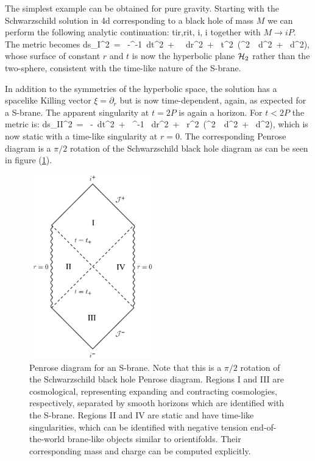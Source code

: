 The simplest example can be obtained for pure gravity. Starting with  the Schwarzschild solution in 4d corresponding to a black hole of mass $M$ we can perform the following analytic continuation:
 \be
 t\rightarrow ir,\qquad  r\rightarrow it, \qquad
 \theta\rightarrow i\theta, \qquad \phi\rightarrow i\phi
 \ee
  together 
with $M\rightarrow iP$. The metric becomes
\be
d\hat s_I^2\ = \ -^{-1}\ dt^2\ + 
\  \ dr^2\ + \ t^2\ \left(\sinh^2\theta\ \ 
d\phi^2\ + \ d\theta^2\right), 
\ee
whose surface of constant $r$ and $t$ is now the 
hyperbolic plane ${\cal H}_2$ rather than the two-sphere, consistent with the time-like nature of the S-brane. 

In addition to the symmetries of the hyperbolic space, the solution has
a spacelike Killing vector $\xi=\partial_r$ but is now time-dependent, 
again, as expected for a S-brane. The apparent singularity at $t=2P$ is
 again a horizon. For $t<2P$ the metric is:
\be
d\hat s_{II}^2\ = \ -\ dt^2\ 
+ \ ^{-1} \ dr^2\ + \ r^2\ \left(\sinh^2\theta\ \
d\phi^2\ + \ d\theta^2\right), 
\ee
which is now static with a time-like singularity at $r=0$. The corresponding Penrose diagram is a $\pi/2$ rotation of the Schwarzschild black hole diagram as can be seen in figure (\ref{sbrane}).

\begin{figure}[t]
\begin{center}
\includegraphics[width=55mm,height=80mm]{Sections/Figures/sbrane.pdf} 
\caption{Penrose diagram for an S-brane. Note that this is a $\pi/2$ rotation of the Schwarzschild black hole Penrose diagram. Regions I and III are cosmological, representing expanding and contracting cosmologies, respectively, separated by smooth horizons which are identified with the S-brane. Regions II and IV are static and have time-like singularities, which can be identified with negative tension end-of-the-world brane-like objects similar to orientifolds. Their corresponding mass and charge can be computed explicitly.} 
\label{sbrane}\end{center}
\end{figure}

